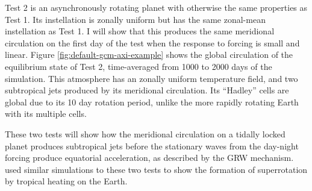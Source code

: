 Test 2 is an asynchronously rotating planet with otherwise the same properties as Test 1. Its instellation is zonally uniform but has the same zonal-mean instellation as Test 1. I will show that this produces the same meridional circulation on the first day of the test when the response to forcing is small and linear. Figure \ref{fig:default-gcm-axi-example} shows the global circulation of the equilibrium state of Test 2, time-averaged from 1000 to 2000 days of the simulation. This atmosphere has an zonally uniform temperature field, and two subtropical jets produced by its meridional circulation. Its ``Hadley'' cells are global due to its 10 day rotation period, unlike the more rapidly rotating Earth with its multiple cells.

 These two tests will show how the meridional circulation on a tidally locked planet produces subtropical jets before the stationary waves from the day-night forcing produce equatorial acceleration, as described by the GRW mechanism. \citet{norton2006tropical} used similar simulations to these two tests to show the formation of superrotation by tropical heating on the Earth.

